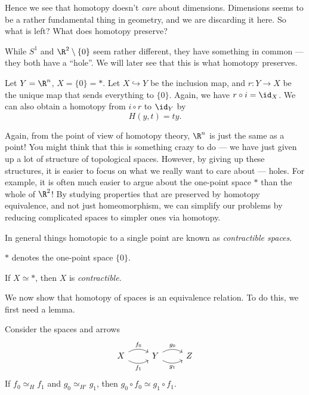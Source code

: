 \documentclass[a4paper]{article}
\begin{document}
Hence we see that homotopy doesn't \emph{care} about dimensions. Dimensions seems to be a rather fundamental thing in geometry, and we are discarding it here. So what is left? What does homotopy preserve?

While $S^1$ and $\R^2 \setminus \{0\}$ seem rather different, they have something in common --- they both have a ``hole''. We will later see that this is what homotopy preserves.

\begin{eg}
  Let $Y = \R^n$, $X = \{0\} = *$. Let $X\hookrightarrow Y$ be the inclusion map, and $r: Y\to X$ be the unique map that sends everything to $\{0\}$. Again, we have $r\circ i = \id_X$. We can also obtain a homotopy from $i \circ r$ to $\id_Y$ by
  \[
    H(y, t) = ty.
  \]
\end{eg}
Again, from the point of view of homotopy theory, $\R^n$ is just the same as a point! You might think that this is something crazy to do --- we have just given up a lot of structure of topological spaces. However, by giving up these structures, it is easier to focus on what we really want to care about --- holes. For example, it is often much easier to argue about the one-point space $*$ than the whole of $\R^2$! By studying properties that are preserved by homotopy equivalence, and not just homeomorphism, we can simplify our problems by reducing complicated spaces to simpler ones via homotopy.

In general things homotopic to a single point are known as \emph{contractible spaces}.
\begin{notation}
  $*$ denotes the one-point space $\{0\}$.
\end{notation}

\begin{defi}
  If $X\simeq *$, then $X$ is \emph{contractible}.
\end{defi}

We now show that homotopy of spaces is an equivalence relation. To do this, we first need a lemma.
\begin{lemma}
  Consider the spaces and arrows
  \[
    \begin{tikzcd}
      X \ar[r, bend left, "f_0"] \ar[r, bend right, "f_1"'] & Y \ar[r, bend left, "g_0"] \ar[r, bend right, "g_1"'] & Z
    \end{tikzcd}
  \]
  If $f_0\simeq_H f_1$ and $g_0\simeq_{H'} g_1$, then $g_0\circ f_0 \simeq g_1 \circ f_1$.
\end{lemma}
\end{document}
